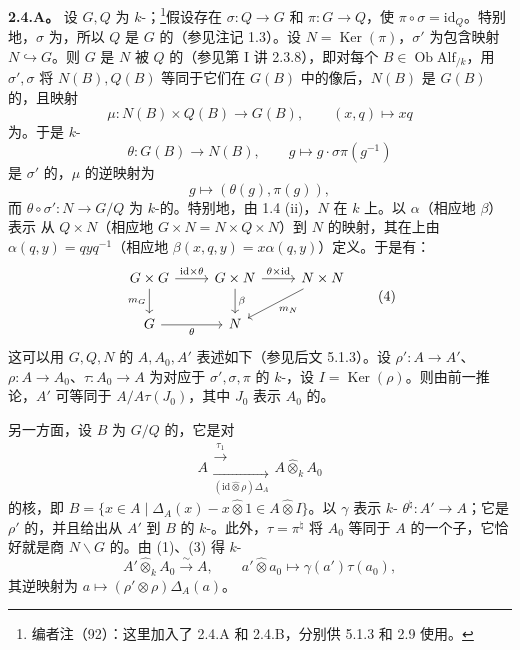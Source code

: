 \textbf{2.4.A。} 设 $G,Q$ 为 $k$-；\footnote{编者注（92）：这里加入了 2.4.A 和 2.4.B，分别供 5.1.3 和 2.9 使用。}假设存在 $\sigma:Q\to G$ 和 $\pi:G\to Q$，使 $\pi\circ\sigma=\mathrm{id}_Q$。特别地，$\sigma$ 为，所以 $Q$ 是 $G$ 的（参见注记 1.3）。设 $N=\operatorname{Ker}(\pi)$，$\sigma'$ 为包含映射 $N\hookrightarrow G$。则 $G$ 是 $N$ 被 $Q$ 的（参见第 I 讲 2.3.8），即对每个 $B\in\operatorname{Ob}\mathrm{Alf}_{/k}$，用 $\sigma',\sigma$ 将 $N(B),Q(B)$ 等同于它们在 $G(B)$ 中的像后，$N(B)$ 是 $G(B)$ 的，且映射
\[
\mu:N(B)\times Q(B)\longrightarrow G(B),\qquad(x,q)\longmapsto xq\tag{1}
\]
为。于是 $k$-
\[
\theta:G(B)\longrightarrow N(B),\qquad g\longmapsto g\cdot\sigma\pi(g^{-1})\tag{2}
\]
是 $\sigma'$ 的，$\mu$ 的逆映射为
\[
g\longmapsto(\theta(g),\pi(g)),\tag{3}
\]
而 $\theta\circ\sigma':N\to G/Q$ 为 $k$-的。特别地，由 1.4 (ii)，$N$ 在 $k$ 上。以 $\alpha$（相应地 $\beta$）表示
从 $Q\times N$（相应地 $G\times N=N\times Q\times N$）到 $N$ 的映射，其在上由 $\alpha(q,y)=qyq^{-1}$（相应地 $\beta(x,q,y)=x\alpha(q,y)$）定义。于是有：
\[
\begin{tikzcd}
G\times G\arrow[r,"\mathrm{id}\times\theta"]\arrow[d,"m_G"']&G\times N\arrow[r,"\theta\times\mathrm{id}"]\arrow[d,"\beta"]&N\times N\arrow[dl,"m_N"]\\
G\arrow[r,"\theta"']&N&
\end{tikzcd}\tag{4}
\]
这可以用 $G,Q,N$ 的 $A,A_0,A'$ 表述如下（参见后文 5.1.3）。设 $\rho':A\to A'$、$\rho:A\to A_0$、$\tau:A_0\to A$ 为对应于 $\sigma',\sigma,\pi$ 的 $k$-，设 $I=\operatorname{Ker}(\rho)$。则由前一推论，$A'$ 可等同于 $A/A\tau(J_0)$，其中 $J_0$ 表示 $A_0$ 的。

另一方面，设 $B$ 为 $G/Q$ 的，它是对
\[
A\mathrel{\substack{\xrightarrow{\tau_1}\\[-.6ex]\xrightarrow[(\mathrm{id}\widehat\otimes\rho)\Delta_A]{}}}A\widehat\otimes_k A_0
\]
的核，即 $B=\{x\in A\mid\Delta_A(x)-x\widehat\otimes1\in A\widehat\otimes I\}$。以 $\gamma$ 表示 $k$- $\theta^\natural:A'\to A$；它是 $\rho'$ 的，并且给出从 $A'$ 到 $B$ 的 $k$-。此外，$\tau=\pi^\natural$ 将 $A_0$ 等同于 $A$ 的一个子，它恰好就是商 $N\backslash G$ 的。由 (1)、(3) 得 $k$-
\[
A'\widehat\otimes_k A_0\xrightarrow{\sim}A,\qquad a'\widehat\otimes a_0\longmapsto\gamma(a')\tau(a_0),\tag{*}
\]
其逆映射为 $a\mapsto(\rho'\otimes\rho)\Delta_A(a)$。

